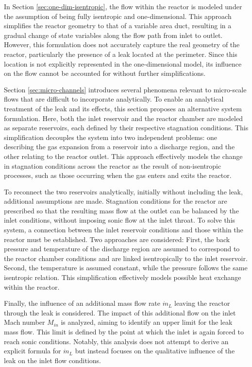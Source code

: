 In Section \ref{sec:one-dim-isentropic}, the flow within the reactor is modeled under the assumption of being fully isentropic and one-dimensional. This approach simplifies the reactor geometry to that of a variable area duct, resulting in a gradual change of state variables along the flow path from inlet to outlet. However, this formulation does not accurately capture the real geometry of the reactor, particularly the presence of a leak located at the perimeter. Since this location is not explicitly represented in the one-dimensional model, its influence on the flow cannot be accounted for without further simplifications.

Section \ref{sec:micro-channels} introduces several phenomena relevant to micro-scale flows that are difficult to incorporate analytically. To enable an analytical treatment of the leak and its effects, this section proposes an alternative system formulation. Here, both the inlet reservoir and the reactor chamber are modeled as separate reservoirs, each defined by their respective stagnation conditions. This simplification decouples the system into two independent problems: one describing the gas expansion from a reservoir into a discharge region, and the other relating to the reactor outlet. This approach effectively models the change in stagnation conditions across the reactor as the result of non-isentropic processes, such as those occurring when the gas enters and exits the reactor.

To reconnect the two reservoirs analytically, initially without including the leak, additional assumptions are made.
Stagnation conditions for the reactor are prescribed so that the resulting mass flow at the outlet can be balanced by the inlet conditions, without imposing sonic flow at the inlet throat.
To solve this system, a connection between the inlet reservoir conditions and those within the reactor must be established.
Two approaches are considered: First, the back pressure and temperature of the discharge region are assumed to correspond to the reactor chamber conditions and are linked isentropically to the inlet reservoir.
Second, the temperature is assumed constant, while the pressure follows the same isentropic relation.
This simplification effectively models possible heat exchange within the reactor.

Finally, the influence of an additional mass flow rate $\dot{m}_L$ leaving the reactor through the leak is considered. The impact of this additional flow on the inlet Mach number $M_{in}$ is analyzed, aiming to identify an upper limit for the leak mass flow. This limit is defined by the point at which the inlet is again forced to reach sonic conditions. Notably, this analysis does not attempt to derive an explicit formula for $\dot{m}_L$ but instead focuses on the qualitative influence of the leak on the inlet flow conditions.


